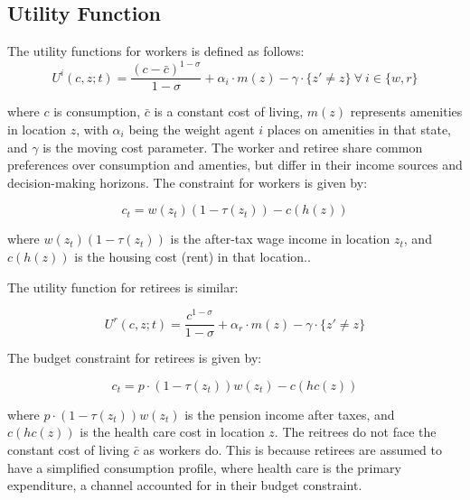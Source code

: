 \documentclass[11pt,a4paper]{article}
\begin{document}
\subsection{Utility Function}
\label{subsec:utility}
The utility functions for workers is defined as follows:
\begin{equation}
  U^i(c, z;t) = \frac{(c-\bar{c})^{1-\sigma}}{1-\sigma} + \alpha_i\cdot m(z) - \gamma\cdot\{z'\ne z\} \ \forall \ i \in \{w, r\}
\end{equation}

where $c$ is consumption, $\bar{c}$ is a constant cost of living, $m(z)$ represents amenities in location $z$, with $\alpha_i$ being the weight agent $i$ places on amenities in that state, and $\gamma$ is the moving cost parameter. The worker and retiree share common preferences over consumption and amenties, but differ in their income sources and decision-making horizons. The constraint for workers is given by:

\begin{equation}
  c_t = w(z_t)(1 - \tau(z_t)) - c(h(z)) 
\end{equation}

where $w(z_t)(1 - \tau(z_t))$ is the after-tax wage income in location $z_t$, and $c(h(z))$ is the housing cost (rent) in that location..

The utility function for retirees is similar:

\begin{equation}
  U^r(c, z;t) = \frac{c^{1-\sigma}}{1-\sigma} + \alpha_r\cdot m(z) - \gamma\cdot\{z'\ne z\}
\end{equation}

The budget constraint for retirees is given by:

\begin{equation}
  c_t = p\cdot (1 - \tau(z_t))w(z_t) - c(hc(z)) 
\end{equation}

where $p\cdot (1 - \tau(z_t))w(z_t)$ is the pension income after taxes, and $c(hc(z))$ is the health care cost in location $z$. The reitrees do not face the constant cost of living $\bar{c}$ as workers do. This is because retirees are assumed to have a simplified consumption profile, where health care is the primary expenditure, a channel accounted for in their budget constraint.
\end{document}
